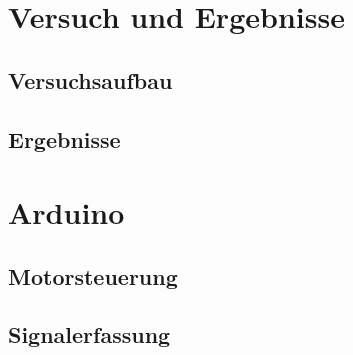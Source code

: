 \documentclass{article}
\begin{document}
\section{Versuch und Ergebnisse}

\subsection{Versuchsaufbau}

\subsection{Ergebnisse}

\section{Arduino}

\subsection{Motorsteuerung}

\subsection{Signalerfassung}
\end{document}

